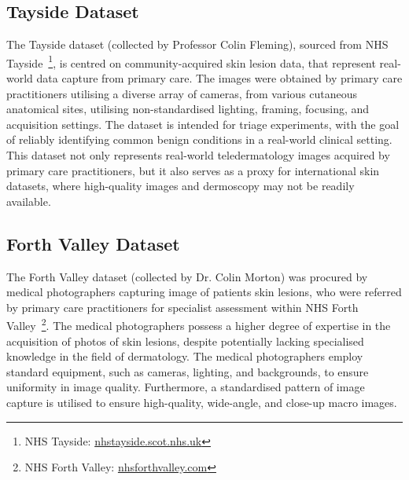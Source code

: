 \subsection{Tayside Dataset}
\label{subsec:tayside_dataset}
The Tayside dataset (collected by Professor Colin Fleming), sourced from NHS Tayside~\footnote{NHS Tayside: \url{nhstayside.scot.nhs.uk}}, is centred on community-acquired skin lesion data, that represent real-world data capture from primary care. The images were obtained by primary care practitioners utilising a diverse array of cameras, from various cutaneous anatomical sites, utilising non-standardised lighting, framing, focusing, and acquisition settings. The dataset is intended for triage experiments, with the goal of reliably identifying common benign conditions in a real-world clinical setting. This dataset not only represents real-world teledermatology images acquired by primary care practitioners, but it also serves as a proxy for international skin datasets, where high-quality images and dermoscopy may not be readily available.

\subsection{Forth Valley Dataset}
\label{subsec:forth_valley_dataset}
The Forth Valley dataset (collected by Dr. Colin Morton) was procured by medical photographers capturing image of patients skin lesions, who were referred by primary care practitioners for specialist assessment within NHS Forth Valley~\footnote{NHS Forth Valley: \url{nhsforthvalley.com}}. The medical photographers possess a higher degree of expertise in the acquisition of photos of skin lesions, despite potentially lacking specialised knowledge in the field of dermatology. The medical photographers employ standard equipment, such as cameras, lighting, and backgrounds, to ensure uniformity in image quality. Furthermore, a standardised pattern of image capture is utilised to ensure high-quality, wide-angle, and close-up macro images.


